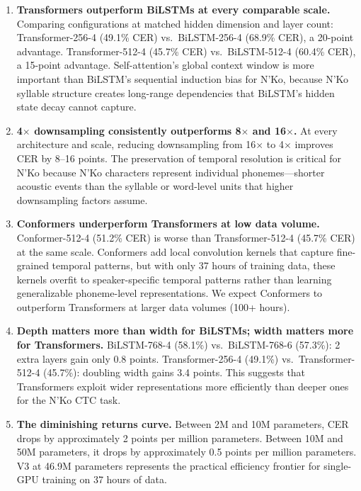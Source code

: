 \documentclass[11pt]{article}
\begin{document}
\begin{enumerate}
\item \textbf{Transformers outperform BiLSTMs at every comparable scale.}
Comparing configurations at matched hidden dimension and layer count: Transformer-256-4 (49.1\% CER) vs.\ BiLSTM-256-4 (68.9\% CER), a 20-point advantage.
Transformer-512-4 (45.7\% CER) vs.\ BiLSTM-512-4 (60.4\% CER), a 15-point advantage.
Self-attention's global context window is more important than BiLSTM's sequential induction bias for N'Ko, because N'Ko syllable structure creates long-range dependencies that BiLSTM's hidden state decay cannot capture.

\item \textbf{4$\times$ downsampling consistently outperforms 8$\times$ and 16$\times$.}
At every architecture and scale, reducing downsampling from 16$\times$ to 4$\times$ improves CER by 8--16 points.
The preservation of temporal resolution is critical for N'Ko because N'Ko characters represent individual phonemes---shorter acoustic events than the syllable or word-level units that higher downsampling factors assume.

\item \textbf{Conformers underperform Transformers at low data volume.}
Conformer-512-4 (51.2\% CER) is worse than Transformer-512-4 (45.7\% CER) at the same scale.
Conformers add local convolution kernels that capture fine-grained temporal patterns, but with only 37 hours of training data, these kernels overfit to speaker-specific temporal patterns rather than learning generalizable phoneme-level representations.
We expect Conformers to outperform Transformers at larger data volumes (100+ hours).

\item \textbf{Depth matters more than width for BiLSTMs; width matters more for Transformers.}
BiLSTM-768-4 (58.1\%) vs.\ BiLSTM-768-6 (57.3\%): 2 extra layers gain only 0.8 points.
Transformer-256-4 (49.1\%) vs.\ Transformer-512-4 (45.7\%): doubling width gains 3.4 points.
This suggests that Transformers exploit wider representations more efficiently than deeper ones for the N'Ko CTC task.

\item \textbf{The diminishing returns curve.}
Between 2M and 10M parameters, CER drops by approximately 2 points per million parameters.
Between 10M and 50M parameters, it drops by approximately 0.5 points per million parameters.
V3 at 46.9M parameters represents the practical efficiency frontier for single-GPU training on 37 hours of data.
\end{enumerate}
\end{document}
